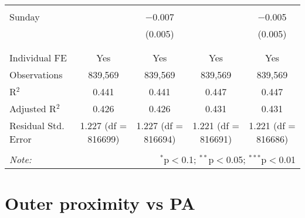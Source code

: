 \documentclass[
]{article}
\begin{document}
\begin{table}[!htbp]
{\begin{tabular}{@{\extracolsep{5pt}}lcccc}
  & & & & \\ 
 Sunday &  & $-$0.007 &  & $-$0.005 \\ 
  &  & (0.005) &  & (0.005) \\ 
  & & & & \\ 
\hline \\[-1.8ex] 
Individual FE & Yes & Yes & Yes & Yes \\ 
Observations & 839,569 & 839,569 & 839,569 & 839,569 \\ 
R$^{2}$ & 0.441 & 0.441 & 0.447 & 0.447 \\ 
Adjusted R$^{2}$ & 0.426 & 0.426 & 0.431 & 0.431 \\ 
Residual Std. Error & 1.227 (df = 816699) & 1.227 (df = 816694) & 1.221 (df = 816691) & 1.221 (df = 816686) \\ 
\hline 
\hline \\[-1.8ex] 
\textit{Note:}  & \multicolumn{4}{r}{$^{*}$p$<$0.1; $^{**}$p$<$0.05; $^{***}$p$<$0.01} \\ 
\end{tabular}
} 
\end{table} 
\newpage
\section{Outer proximity vs PA}
\end{document}
